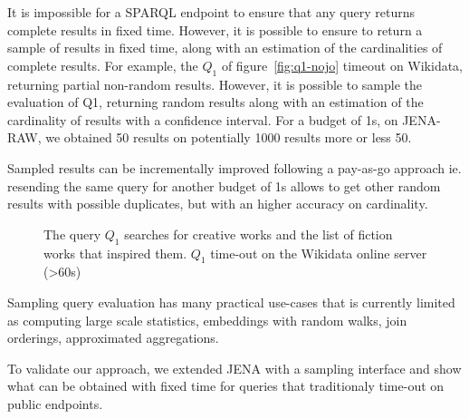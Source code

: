 It is impossible for a SPARQL endpoint to ensure that any query
returns complete results in fixed time. However, it is possible to
ensure to return a sample of results in fixed time, along with an
estimation of the cardinalities of complete results. For example, the
$Q_1$ of figure~\ref{fig:q1-nojo} timeout on Wikidata, returning
partial non-random results. However, it is possible to sample the
evaluation of Q1, returning random results along with an estimation of
the cardinality of results with a confidence interval. For a budget of
1s, on JENA-RAW, we obtained 50 results on potentially 1000 results
more or less 50.

Sampled results can be incrementally improved following a
pay-as-go approach ie. resending the same
query for another budget of 1s allows to get other random results with
possible duplicates, but with an higher accuracy on cardinality.



\begin{figure}[t]
 \begin{center}
 \end{center}
 \caption{The query $Q_1$ searches for creative works and the list of
  fiction works that inspired them. $Q_1$ time-out on
  the Wikidata online server (>60s)}
 \label{fig:q1}
\end{figure}

Sampling query evaluation has many practical use-cases that is
currently limited as computing
large scale statistics\cite{soulet2019anytime}, embeddings with random
walks\cite{ristoski2016rdf2vec}, join
orderings\cite{DBLP:conf/cidr/LeisRGK017}, approximated
aggregations\cite{DBLP:journals/tods/LiWYZ19}.




To validate our
approach, we extended JENA with a sampling interface and show what can
be obtained with fixed time for queries that traditionaly time-out on
public endpoints.




